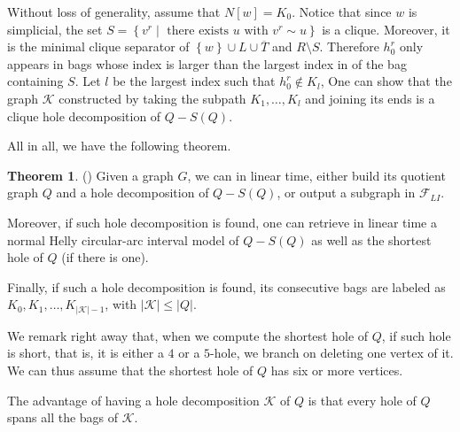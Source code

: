 \documentclass{article}
\theoremstyle{definition}
\newtheorem{thm}{Theorem}
\begin{document}
    Without loss of generality,
    assume that $N\left[w\right] = K_0$.
    Notice that since $w$ is
    simplicial, the set
    $S = \left\{v^{r} \mid \text{ there exists
    $u$ with } v^{r} \sim u\right\}$ 
    is a clique. Moreover, 
    it is the minimal 
    clique separator of
    $\left\{w\right\} \cup L \cup \overline{T}$
    and $R \setminus S$.
    Therefore $h_0^{r}$ 
    only appears in bags
    whose index is larger
    than the largest index in
    of the bag containing $S$.
    Let $l$ be the largest
    index such that $h_0^{r} \not\in K_{l}$,
    One can show that the graph $\mathcal{K}$
    constructed by taking
    the subpath $K_1, \ldots, K_{l}$ 
    and joining its ends is
    a clique hole decomposition
    of $Q - S\left(Q\right)$.
    
    All in all, we have the following 
    theorem.

    \begin{thm} (\cite{main})
        Given a graph $G$, we
        can in linear time, either
        build its quotient graph
        $Q$ and a hole decomposition
        of $Q - S\left(Q\right)$,
        or output a subgraph
        in $\mathcal{F}_{LI}$.
        
        Moreover, if such hole
        decomposition is found,
        one can retrieve in linear
        time a normal Helly
        circular-arc
        interval model of $Q - S\left(Q\right)$
        as well as the shortest hole 
        of $Q$ (if there is one).
    
        Finally, if such a hole 
        decomposition is found,
        its consecutive bags are
        labeled as $K_0, K_1, \ldots, K_{\left|\mathcal{K}\right|-1}$,
        with $\left|\mathcal{K}\right| \leq \left|Q\right|$.
        \label{olive-ring}
    \end{thm}

    We remark right away
    that, when we compute
    the shortest hole of $Q$,
    if such hole is short,
    that is, it is either 
    a $4$ or a $5$-hole, 
    we branch on deleting one vertex of it.
    We can thus assume
    that the shortest
    hole of $Q$ has
    six or more vertices.
        
    The advantage of having a hole
    decomposition $\mathcal{K}$ of $Q$ is 
    that every hole of $Q$
    spans all the bags of $\mathcal{K}$.
\end{document}
